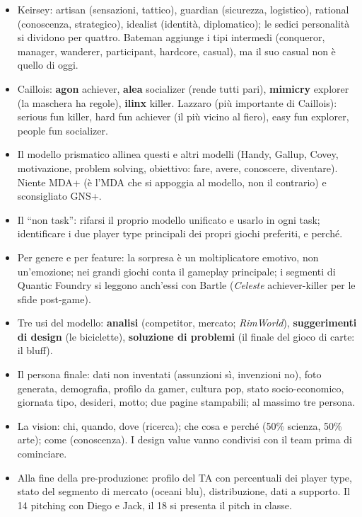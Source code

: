 \begin{itemize}
        scientist/hacker, networker/friend. Single player e multiplayer: killer e
        achiever si incontrano sulla leaderboard (ma con mezzi diversi), explorer e
        socializer sulla storia (lore regolata contro dramma).
  \item Keirsey: artisan (sensazioni, tattico), guardian (sicurezza, logistico),
        rational (conoscenza, strategico), idealist (identità, diplomatico); le
        sedici personalità si dividono per quattro. Bateman aggiunge i tipi
        intermedi (conqueror, manager, wanderer, participant, hardcore, casual), ma
        il suo casual non è quello di oggi.
  \item Caillois: \textbf{agon} achiever, \textbf{alea} socializer (rende tutti
        pari), \textbf{mimicry} explorer (la maschera ha regole), \textbf{ilinx}
        killer. Lazzaro (più importante di Caillois): serious fun killer, hard fun
        achiever (il più vicino al fiero), easy fun explorer, people fun socializer.
  \item Il modello prismatico allinea questi e altri modelli (Handy, Gallup, Covey,
        motivazione, problem solving, obiettivo: fare, avere, conoscere, diventare).
        Niente MDA+ (è l'MDA che si appoggia al modello, non il contrario) e
        sconsigliato GNS+.
  \item Il ``non task'': rifarsi il proprio modello unificato e usarlo in ogni task;
        identificare i due player type principali dei propri giochi preferiti, e
        perché.
  \item Per genere e per feature: la sorpresa è un moltiplicatore emotivo, non
        un'emozione; nei grandi giochi conta il gameplay principale; i segmenti di
        Quantic Foundry si leggono anch'essi con Bartle (\emph{Celeste}
        achiever-killer per le sfide post-game).
  \item Tre usi del modello: \textbf{analisi} (competitor, mercato; \emph{RimWorld}),
        \textbf{suggerimenti di design} (le biciclette), \textbf{soluzione di
        problemi} (il finale del gioco di carte: il bluff).
  \item Il persona finale: dati non inventati (assunzioni sì, invenzioni no), foto
        generata, demografia, profilo da gamer, cultura pop, stato socio-economico,
        giornata tipo, desideri, motto; due pagine stampabili; al massimo tre persona.
  \item La vision: chi, quando, dove (ricerca); che cosa e perché (50\% scienza,
        50\% arte); come (conoscenza). I design value vanno condivisi con il team
        prima di cominciare.
  \item Alla fine della pre-produzione: profilo del TA con percentuali dei player
        type, stato del segmento di mercato (oceani blu), distribuzione, dati a
        supporto. Il 14 pitching con Diego e Jack, il 18 si presenta il pitch in
        classe.
\end{itemize}
